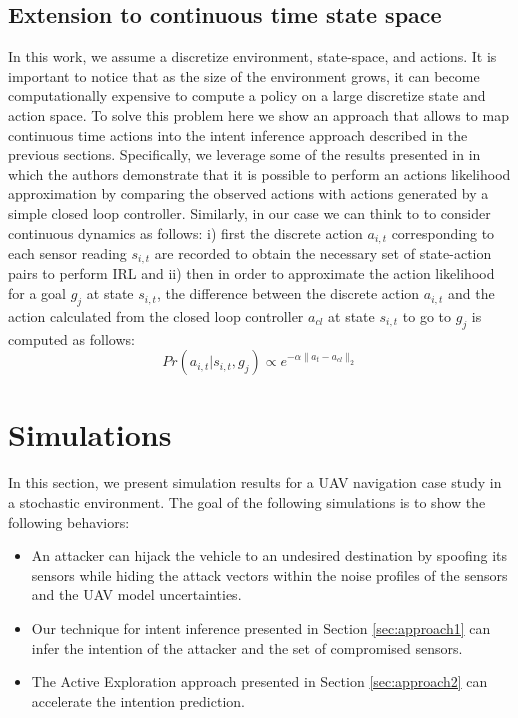 \documentclass[letterpaper, 10 pt, conference]{ieeeconf}  %
\begin{document}
\subsection{Extension to continuous time state space}
In this work, we assume a discretize  environment, state-space, and actions. It is important to notice that as the size of the environment grows, it can become computationally expensive to compute a policy on a large discretize state and action space. To solve this problem here we show an approach that allows to map continuous time actions into the intent inference approach described in the previous sections. Specifically, we leverage some of the results presented in \cite{michini2013scalable} in which the authors demonstrate that it is possible to perform an actions likelihood approximation by comparing the observed actions with actions generated by a simple closed loop controller. Similarly, in our case we can think to to consider continuous dynamics as follows: i) first the discrete action $a_{i,t}$ corresponding to each sensor reading $s_{i,t}$ are recorded to obtain the necessary set of state-action pairs to perform IRL and ii) then in order to approximate the action likelihood for a goal $g_j$ at state $s_{i,t}$, the difference between the discrete action $a_{i,t}$ and the action calculated from the closed loop controller $a_{cl}$ at state $s_{i,t}$ to go to $g_j$ is computed as follows:
\begin{equation}
 Pr(a_{i,t}|s_{i,t},g_j) \propto e^{-\alpha \lVert a_t - a_{cl} \rVert_{2}}
\end{equation}

\section{Simulations}\label{sec:simulations}
In this section, we present simulation results for a UAV navigation case study in a stochastic environment.
The goal of the following simulations is to show the following behaviors:
\begin{itemize}
    \item An attacker can hijack the vehicle to an undesired destination by spoofing its sensors while hiding the attack vectors within the noise profiles of the sensors and the UAV model uncertainties.
    \item Our technique for intent inference presented in Section \ref{sec:approach1} can infer the intention of the attacker and the set of compromised sensors.
    \item The Active Exploration approach presented in Section \ref{sec:approach2} can accelerate the intention prediction.
\end{itemize}
\end{document}
